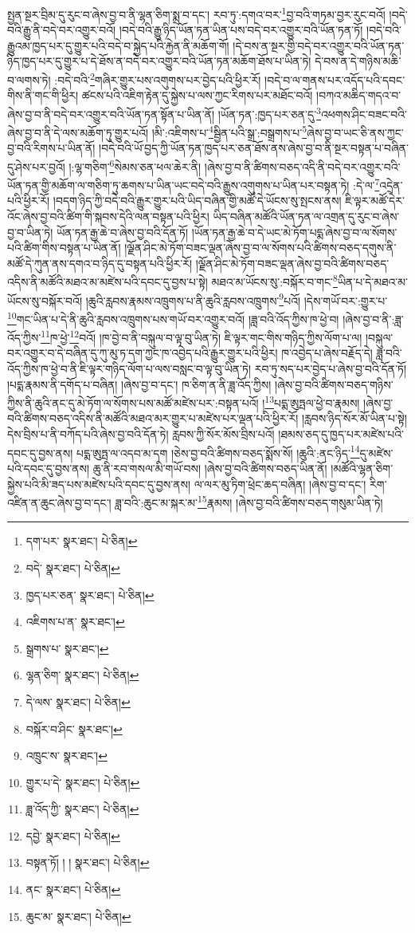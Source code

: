 སྤྱན་སྔར་བྲིམ་དུ་རུང་བ་ཞེས་བྱ་བ་ནི་ལྷན་ཅིག་སྨྲ་བ་དང་། རབ་ཏུ་:དགའ་བར་\footnote{དག་པར་  སྣར་ཐང་།  པེ་ཅིན། }བྱ་བའི་གཏམ་བྱར་རུང་བའོ། །བདེ་བའི་རྒྱུ་ནི་བདེ་བར་འགྱུར་བའོ། །བདེ་བའི་རྒྱུ་ཉིད་ཡོན་ཏན་ཡིན་པས་བདེ་བར་འགྱུར་བའི་ཡོན་ཏན་ཏོ། །བདེ་བའི་རྒྱུའམ་ཁྱད་པར་དུ་གྱུར་པའི་བདེ་བ་སྐྱེད་པའི་རྐྱེན་ནི་མཆོག་གོ། །དེ་བས་ན་སྔར་གྱི་བདེ་བར་འགྱུར་བའི་ཡོན་ཏན་ཉིད་ཁྱད་པར་དུ་གྱུར་པ་དེ་ཐོས་ན་བདེ་བར་འགྱུར་བའི་ཡོན་ཏན་མཆོག་ཐོས་པ་ཡིན་ཏེ། དེ་བས་ན་དེ་གཉིས་མཆི་བ་ལགས་ཏེ། :བདེ་བའི་\footnote{བདེ་  སྣར་ཐང་།  པེ་ཅིན། }གཞིར་གྱུར་པས་འགུགས་པར་བྱེད་པའི་ཕྱིར་རོ། །བདེ་བ་ལ་གནས་པར་འདོད་པའི་དབང་གིས་ནི་གང་གི་ཕྱིར། ཚངས་པའི་འཇིག་རྟེན་དུ་སྐྱེས་པ་ལས་ཀྱང་རིགས་པར་མཐོང་བའོ། །བཀའ་མཆིད་གདའ་བ་ཞེས་བྱ་བ་ནི་བདེ་བར་འགྱུར་བའི་ཡོན་ཏན་སྟོན་པ་ཡིན་ནོ། །ཡོན་ཏན་:ཁྱད་པར་ཅན་དུ་\footnote{ཁྱད་པར་ཅན་  སྣར་ཐང་།  པེ་ཅིན། }འཕགས་ཤིང་བཟང་བའི་ཞེས་བྱ་བ་ནི་དེ་ལས་མཆོག་ཏུ་གྱུར་པའོ། །མི་:འཇིགས་པ་\footnote{འཇིགས་པ་ན་  སྣར་ཐང་། }སྦྱིན་པའི་སྒྲ་:བསྒྲགས་པ་\footnote{སྒྲགས་པ་  སྣར་ཐང་། }ཞེས་བྱ་བ་ཡང་ཅི་ནས་ཀྱང་བྱ་བའི་རིགས་པ་ཡིན་ནོ། །བདེ་བའི་ཡོ་བྱད་ཀྱི་ཡོན་ཏན་ཁྱད་པར་ཅན་ཐོས་ནས་ཞེས་བྱ་བ་ནི་སྔར་བསྟན་པ་བཞིན་དུ་ཤེས་པར་བྱའོ། །:ལྷ་གཅིག་\footnote{ལྷན་ཅིག་  སྣར་ཐང་།  པེ་ཅིན། }སེམས་ཅན་ཕལ་ཆེར་ནི། །ཞེས་བྱ་བ་ནི་ཚིགས་བཅད་འདི་ནི་བདེ་བར་འགྱུར་བའི་ཡོན་ཏན་གྱི་མཆོག་ལ་གཅིག་ཏུ་ཆགས་པ་ཡིན་ཡང་བདེ་བའི་རྒྱུས་འགུགས་པ་ཡིན་པར་བསྟན་ཏེ། :དེ་ལ་\footnote{དེ་ལས་  སྣར་ཐང་།  པེ་ཅིན། }འདྲེན་པའི་ཕྱིར་རོ། །བདག་ཉིད་ཀྱི་བདེ་བའི་རྒྱུར་གྱུར་པའི་ཡིད་བཞིན་གྱི་མཚོ་དེ་ཡོངས་སུ་སྤངས་ནས། ཇི་ལྟར་མཚོ་དེར་འོང་ཞེས་བྱ་བའི་ཚིག་གི་སྐབས་དེའི་ལན་བསྟན་པའི་ཕྱིར། ཡིད་བཞིན་མཚོའི་ཡོན་ཏན་ལ་འགྲན་དུ་རུང་བ་ཞེས་བྱ་བ་ཡིན་ཏེ། ཡོན་ཏན་རྒྱ་ཆེ་བ་ཞེས་བྱ་བའི་དོན་ཏོ། །ཡོན་ཏན་རྒྱ་ཆེ་བ་དེ་ཡང་མེ་ཏོག་པདྨ་ཞེས་བྱ་བ་ལ་སོགས་པའི་ཚིག་གིས་བསྟན་པ་ཡིན་ནོ། །ལྗོན་ཤིང་མེ་ཏོག་བཟང་ལྡན་ཞེས་བྱ་བ་ལ་སོགས་པའི་ཚིགས་བཅད་དགུས་ནི་མཚོ་དེ་ཀུན་ནས་དགའ་བ་ཉིད་དུ་བསྟན་པའི་ཕྱིར་རོ། །ལྗོན་ཤིང་མེ་ཏོག་བཟང་ལྡན་ཞེས་བྱ་བའི་ཚིགས་བཅད་འདིས་ནི་མཚོའི་མཐའ་མ་མཛེས་པའི་དབང་དུ་བྱས་པ་སྟེ། མཐའ་མ་ཡོངས་སུ་:བསྐོར་བ་གང་\footnote{བསྐོར་བ་ཤིང་  སྣར་ཐང་། }ཡིན་པ་དེ་མཐའ་མ་ཡོངས་སུ་བསྐོར་བའོ། །ཆུའི་རླབས་རྣམས་འཁྲུགས་པ་ནི་ཆུའི་རླབས་འཁྲུགས་\footnote{འཁྲུང་ས་  སྣར་ཐང་། }པའོ། །དེས་གཡོ་བར་:གྱུར་པ་\footnote{གྱུར་པ་དེ་  སྣར་ཐང་།  པེ་ཅིན། }གང་ཡིན་པ་དེ་ནི་ཆུའི་རླབས་འཁྲུགས་པས་གཡོ་བར་འགྱུར་བའོ། །ཟླ་བའི་འོད་ཀྱིས་ཁ་ཕྱེ་བ། །ཞེས་བྱ་བ་ནི་:ཟླ་འོད་ཀྱིས་\footnote{ཟླ་འོད་ཀྱི་  སྣར་ཐང་།  པེ་ཅིན། }ཁ་ཕྱེ་\footnote{དབྱེ་  སྣར་ཐང་།  པེ་ཅིན། }བའོ། །ཁ་བྱེ་བ་ནི་བསྐུལ་བ་ལྟ་བུ་ཡིན་ཏེ། ཇི་ལྟར་གང་གིས་གཉིད་ཀྱིས་ལོག་པ་ལ། །བསྐུལ་བར་འགྱུར་བ་དེ་བཞིན་དུ་ཀུ་མུ་ཏ་དག་ཀྱང་ཁ་འབྱེད་པའི་རྒྱུར་གྱུར་པའི་ཕྱིར། ཁ་འབྱེད་པ་ཞེས་བརྗོད་དེ། ཟླ་བའི་འོད་ཀྱིས་ཁ་ཕྱེ་བ་ནི་ཇི་ལྟར་གཉིད་ལོག་པ་ལས་བསླང་བ་ལྟ་བུ་ཡིན་ཏེ། རབ་ཏུ་སད་པར་བྱེད་པ་ཞེས་བྱ་བའི་དོན་ཏོ། །པདྨ་རྣམས་ནི་དགོད་པ་བཞིན། །ཞེས་བྱ་བ་དང་། ཁ་ཅིག་ན་ནི་ཟླ་འོད་ཀྱིས། །ཞེས་བྱ་བའི་ཚིགས་བཅད་གཉིས་ཀྱིས་ནི་ཆུའི་ནང་དུ་མེ་ཏོག་ལ་སོགས་པས་མཚོ་མཛེས་པར་:བསྟན་པའོ། །\footnote{བསྟན་ཏོ། ། །  སྣར་ཐང་།  པེ་ཅིན། }པདྨ་ཨུཏྤལ་ཕྱེ་བ་རྣམས། །ཞེས་བྱ་བའི་ཚིགས་བཅད་འདིས་ནི་མཚོའི་མཐའ་མར་གྱུར་པ་མཛེས་པར་ལྡན་པའི་ཕྱིར་རོ། །རླབས་ཉིད་སོར་མོ་ཡིན་པ་སྟེ། དེས་བྲིས་པ་ནི་བཀོད་པའི་ཞེས་བྱ་བའི་དོན་ཏེ། རླབས་ཀྱི་སོར་མོས་བྲིས་པའོ། །ཐམས་ཅད་དུ་ཁྱད་པར་མཛེས་པའི་དབང་དུ་བྱས་ནས། པདྨ་ཨུཏྤ་ལ་འདབ་མ་དག །ཅེས་བྱ་བའི་ཚིགས་བཅད་སྨོས་སོ། །ཆུའི་:ནང་ཉིད་\footnote{ནང་  སྣར་ཐང་།  པེ་ཅིན། }དུ་མཛེས་པའི་དབང་དུ་བྱས་ནས། ཆུ་ནི་རབ་གསལ་མི་གཡོ་བས། །ཞེས་བྱ་བའི་ཚིགས་བཅད་ཡིན་ནོ། །མཚོའི་ལྷན་ཅིག་སྐྱེས་པའི་མི་ཟད་པས་མཛེས་པའི་དབང་དུ་བྱས་ནས། ལ་ལར་མུ་ཏིག་ཕྲེང་ཆད་བཞིན། །ཞེས་བྱ་བ་དང་། རིག་འཛིན་ན་ཆུང་ཞེས་བྱ་བ་དང་། ཟླ་བའི་:ཆུང་མ་སྐར་མ་\footnote{ཆུང་མ་  སྣར་ཐང་།  པེ་ཅིན། }རྣམས། །ཞེས་བྱ་བའི་ཚིགས་བཅད་གསུམ་ཡིན་ཏེ། 